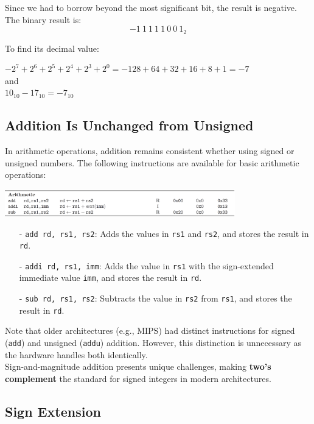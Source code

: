Since we had to borrow beyond the most significant bit, the result is negative. The binary result is:
\[
-1\ 1\ 1\ 1\ 1\ 0\ 0\ 1_2
\]

To find its decimal value:
\begin{center}
    $-2^7 + 2^6 + 2^5 + 2^4 + 2^3 + 2^0 = -128 + 64 + 32 + 16 + 8 + 1 =-7$ \\
    and \\
    $
    10_{10} - 17_{10} = -7_{10}
    $
\end{center}


\subsection{Addition Is Unchanged from Unsigned}

In arithmetic operations, addition remains consistent whether using signed or unsigned numbers. The following instructions are available for basic arithmetic operations:
\begin{center}
    \includegraphics[width=0.75\textwidth]{chapters/chapter1e/images/addition.png}
\end{center}
\begin{itemize}
    \item[-] \texttt{add rd, rs1, rs2}: Adds the values in \texttt{rs1} and \texttt{rs2}, and stores the result in \texttt{rd}.
    \item[-] \texttt{addi rd, rs1, imm}: Adds the value in \texttt{rs1} with the sign-extended immediate value \texttt{imm}, and stores the result in \texttt{rd}.
    \item[-] \texttt{sub rd, rs1, rs2}: Subtracts the value in \texttt{rs2} from \texttt{rs1}, and stores the result in \texttt{rd}.
\end{itemize}
 
Note that older architectures (e.g., MIPS) had distinct instructions for signed (\texttt{add}) and unsigned (\texttt{addu}) addition. However, this distinction is unnecessary as the hardware handles both identically. \\
\vspace*{5px}
Sign-and-magnitude addition presents unique challenges, making \textbf{two's complement} the standard for signed integers in modern architectures.

\subsection{Sign Extension}

